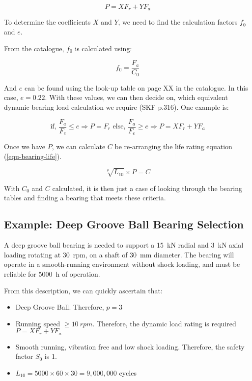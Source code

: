\begin{equation}
    P = XF_r + YF_a
\end{equation}

To determine the coefficients \(X\) and \(Y\), we need to find the calculation factors \(f_0\) and \(e\).

From the catalogue, \(f_0\) is calculated using:

\begin{equation}
    f_0 = \frac{F_a}{C_0}
\end{equation}

And \(e\) can be found using the look-up table on page XX in the catalogue. In this case, \(e=0.22\). With these values, we can then decide on, which equivalent dynamic bearing load calculation we require (SKF p.316). One example is:

\begin{equation}
    \text{if, }\frac{F_a}{F_e}\le e \Rightarrow P=F_r \text{ else, } \frac{F_a}{F_e}\ge e \Rightarrow P=XF_r+YF_a
\end{equation}

Once we have \(P\), we can calculate \(C\) be re-arranging the life rating equation (\cref{equ-bearing-life}). 

\begin{equation}
    \sqrt[p]{L_{10}}\times P = C
\end{equation} 

With \(C_0\) and \(C\) calculated, it is then just a case of looking through the bearing tables and finding a bearing that meets these criteria.

\subsection{Example: Deep Groove Ball Bearing Selection}

A deep groove ball bearing is needed to support a \SI{15}{\kilo\newton} radial and \SI{3}{\kilo\newton} axial loading rotating at \SI{30}{rpm}, on a shaft of \SI{30}{\milli\metre} diameter. The bearing will operate in a smooth-running environment without shock loading, and must be reliable for \SI{5000}{\hour} of operation.

From this description, we can quickly ascertain that:

\begin{itemize}
    \item Deep Groove Ball. Therefore, \(p=3\)
    \item Running speed \(\ge \SI{10}{rpm}\). Therefore, the dynamic load rating is required \(P=XF_r+YF_a\)
    \item Smooth running, vibration free and low shock loading. Therefore, the safety factor \(S_0\) is 1.
    \item \(L_{10} = 5000 \times 60 \times 30 = 9,000,000\) cycles 
\end{itemize}

